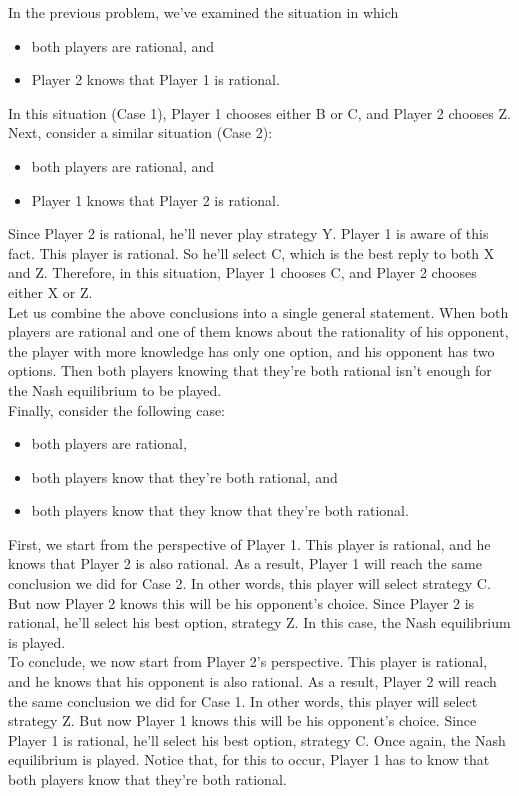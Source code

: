 \documentclass[11pt]{article}
\begin{document}
In the previous problem, we've examined the situation in which
\begin{itemize}
\item both players are rational, and
\item Player 2 knows that Player 1 is rational.
\end{itemize}
In this situation (Case 1), Player 1 chooses either B or C, and Player 2 chooses
Z.\\
Next, consider a similar situation (Case 2):
\begin{itemize}
\item both players are rational, and
\item Player 1 knows that Player 2 is rational.
\end{itemize}
Since Player 2 is rational, he'll never play strategy Y. Player 1 is aware of
this fact. This player is rational. So he'll select C, which is the best reply
to both X and Z. Therefore, in this situation, Player 1 chooses C, and Player 2
chooses either X or Z.\\
Let us combine the above conclusions into a single general statement. When both
players are rational and one of them knows about the rationality of his
opponent, the player with more knowledge has only one option, and his opponent
has two options. Then both players knowing that they're both rational isn't
enough for the Nash equilibrium to be played.\\
Finally, consider the following case:
\begin{itemize}
\item both players are rational,
\item both players know that they're both rational, and
\item both players know that they know that they're both rational.
\end{itemize}
First, we start from the perspective of Player 1. This player is rational, and
he knows that Player 2 is also rational. As a result, Player 1 will reach the
same conclusion we did for Case 2. In other words, this player will select
strategy C. But now Player 2 knows this will be his opponent's choice. Since
Player 2 is rational, he'll select his best option, strategy Z. In this case,
the Nash equilibrium is played.\\
To conclude, we now start from Player 2's perspective. This player is rational,
and he knows that his opponent is also rational. As a result, Player 2 will
reach the same conclusion we did for Case 1. In other words, this player will
select strategy Z. But now Player 1 knows this will be his opponent's choice.
Since Player 1 is rational, he'll select his best option, strategy C. Once
again, the Nash equilibrium is played. Notice that, for this to occur, Player 1
has to know that both players know that they're both rational.
\end{document}
